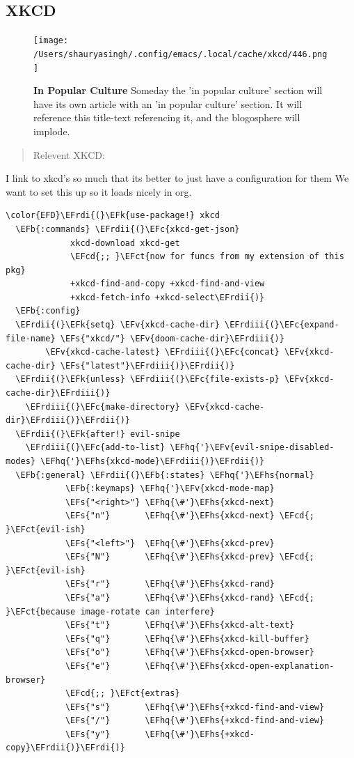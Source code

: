 \documentclass{scrartcl}
\newcommand{\EFk}[1]{\textcolor{EFk}{#1}} %
\newcommand{\EFs}[1]{\textcolor{EFs}{#1}} %
\newcommand{\EFb}[1]{\textcolor{EFb}{#1}} %
\newcommand{\EFct}[1]{\textcolor{EFct}{#1}} %
\newcommand{\EFc}[1]{\textcolor{EFc}{#1}} %
\newcommand{\EFv}[1]{\textcolor{EFv}{#1}} %
\newcommand{\EFcd}[1]{\textcolor{EFcd}{#1}} %
\newcommand{\EFhq}[1]{#1} %
\newcommand{\EFhs}[1]{#1} %
\newcommand{\EFrdi}[1]{#1} %
\newcommand{\EFrdii}[1]{#1} %
\newcommand{\EFrdiii}[1]{#1} %
\begin{document}
\subsection{XKCD}
\label{sec:org1e88aeb}
\begin{figure}[!htb]
	  \centering
	  \texttt{[image: /Users/shauryasingh/.config/emacs/.local/cache/xkcd/446.png]}
  \caption*{\label{xkcd:446} \textbf{In Popular Culture} Someday the 'in popular culture' section will have its own article with an 'in popular culture' section.  It will reference this title-text referencing it, and the blogosphere will implode.}
	\end{figure}

\begin{quote}
Relevent XKCD:
\end{quote}

I link to xkcd's so much that its better to just have a configuration for them
We want to set this up so it loads nicely in org.
\begin{Code}
\begin{Verbatim}[]
\color{EFD}\EFrdi{(}\EFk{use-package!} xkcd
  \EFb{:commands} \EFrdii{(}\EFc{xkcd-get-json}
             xkcd-download xkcd-get
             \EFcd{;; }\EFct{now for funcs from my extension of this pkg}
             +xkcd-find-and-copy +xkcd-find-and-view
             +xkcd-fetch-info +xkcd-select\EFrdii{)}
  \EFb{:config}
  \EFrdii{(}\EFk{setq} \EFv{xkcd-cache-dir} \EFrdiii{(}\EFc{expand-file-name} \EFs{"xkcd/"} \EFv{doom-cache-dir}\EFrdiii{)}
        \EFv{xkcd-cache-latest} \EFrdiii{(}\EFc{concat} \EFv{xkcd-cache-dir} \EFs{"latest"}\EFrdiii{)}\EFrdii{)}
  \EFrdii{(}\EFk{unless} \EFrdiii{(}\EFc{file-exists-p} \EFv{xkcd-cache-dir}\EFrdiii{)}
    \EFrdiii{(}\EFc{make-directory} \EFv{xkcd-cache-dir}\EFrdiii{)}\EFrdii{)}
  \EFrdii{(}\EFk{after!} evil-snipe
    \EFrdiii{(}\EFc{add-to-list} \EFhq{'}\EFv{evil-snipe-disabled-modes} \EFhq{'}\EFhs{xkcd-mode}\EFrdiii{)}\EFrdii{)}
  \EFb{:general} \EFrdii{(}\EFb{:states} \EFhq{'}\EFhs{normal}
            \EFb{:keymaps} \EFhq{'}\EFv{xkcd-mode-map}
            \EFs{"<right>"} \EFhq{\#'}\EFhs{xkcd-next}
            \EFs{"n"}       \EFhq{\#'}\EFhs{xkcd-next} \EFcd{; }\EFct{evil-ish}
            \EFs{"<left>"}  \EFhq{\#'}\EFhs{xkcd-prev}
            \EFs{"N"}       \EFhq{\#'}\EFhs{xkcd-prev} \EFcd{; }\EFct{evil-ish}
            \EFs{"r"}       \EFhq{\#'}\EFhs{xkcd-rand}
            \EFs{"a"}       \EFhq{\#'}\EFhs{xkcd-rand} \EFcd{; }\EFct{because image-rotate can interfere}
            \EFs{"t"}       \EFhq{\#'}\EFhs{xkcd-alt-text}
            \EFs{"q"}       \EFhq{\#'}\EFhs{xkcd-kill-buffer}
            \EFs{"o"}       \EFhq{\#'}\EFhs{xkcd-open-browser}
            \EFs{"e"}       \EFhq{\#'}\EFhs{xkcd-open-explanation-browser}
            \EFcd{;; }\EFct{extras}
            \EFs{"s"}       \EFhq{\#'}\EFhs{+xkcd-find-and-view}
            \EFs{"/"}       \EFhq{\#'}\EFhs{+xkcd-find-and-view}
            \EFs{"y"}       \EFhq{\#'}\EFhs{+xkcd-copy}\EFrdii{)}\EFrdi{)}
\end{Verbatim}
\end{Code}
\end{document}
